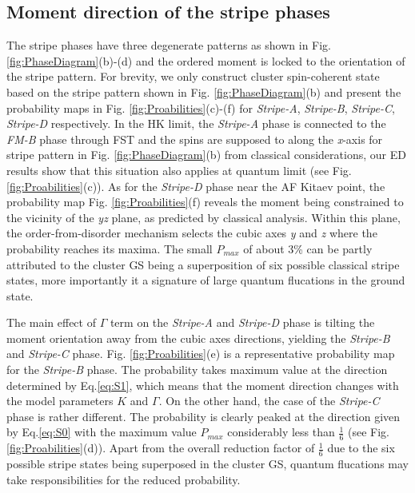 \documentclass[aps,prb,reprint,amsfonts,amsmath,amssymb,showpacs,groupedaddress,superscriptaddress]{revtex4-1}
\begin{document}
\subsection{Moment direction of the stripe phases}
The stripe phases have three degenerate patterns as shown in Fig. \ref{fig:PhaseDiagram}(b)-(d) and the ordered moment is locked to the orientation of the stripe pattern. For brevity, we only construct cluster spin-coherent state based on the stripe pattern shown in Fig. \ref{fig:PhaseDiagram}(b) and present the probability maps in Fig. \ref{fig:Proabilities}(c)-(f) for \emph{Stripe-A}, \emph{Stripe-B}, \emph{Stripe-C}, \emph{Stripe-D} respectively. In the HK limit, the \emph{Stripe-A} phase is connected to the \emph{FM-B} phase through FST and the spins are supposed to along the \emph{x}-axis for stripe pattern in Fig. \ref{fig:PhaseDiagram}(b) from classical considerations, our ED results show that this situation also applies at quantum limit (see Fig. \ref{fig:Proabilities}(c)). As for the \emph{Stripe-D} phase near the AF Kitaev point, the probability map Fig. \ref{fig:Proabilities}(f) reveals the moment being constrained to the vicinity of the \emph{yz} plane, as predicted by classical analysis. Within this plane, the order-from-disorder mechanism selects the cubic axes \emph{y} and \emph{z} where the probability reaches its maxima. The small $P_{max}$ of about 3\% can be partly attributed to the cluster GS being a superposition of six possible classical stripe states, more importantly it a signature of large quantum flucations in the ground state.

The main effect of $\Gamma$ term on the \emph{Stripe-A} and \emph{Stripe-D} phase is tilting the moment orientation away from the cubic axes directions, yielding the \emph{Stripe-B} and \emph{Stripe-C} phase. Fig. \ref{fig:Proabilities}(e) is a representative probability map for the \emph{Stripe-B} phase. The probability takes maximum value at the direction determined by Eq.\eqref{eq:S1}, which means that the moment direction changes with the model parameters $K$ and $\Gamma$. On the other hand, the case of the \emph{Stripe-C} phase is rather different. The probability is clearly peaked at the direction given by Eq.\eqref{eq:S0} with the maximum value $P_{max}$ considerably less than $\frac{1}{6}$ (see Fig. \ref{fig:Proabilities}(d)). Apart from the overall reduction factor of $\frac{1}{6}$ due to the six possible stripe states being superposed in the cluster GS, quantum flucations may take responsibilities for the reduced probability.
\end{document}
